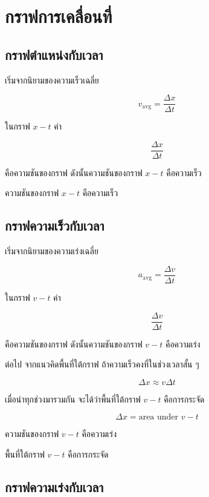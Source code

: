 \section{กราฟการเคลื่อนที่}

\subsection{กราฟตำแหน่งกับเวลา}

เริ่มจากนิยามของความเร็วเฉลี่ย

\[
v_{\text{avg}}=\frac{\Delta x}{\Delta t}
\]

ในกราฟ $x-t$ ค่า

\[
\frac{\Delta x}{\Delta t}
\]

คือความชันของกราฟ ดังนั้นความชันของกราฟ $x-t$ คือความเร็ว

\begin{tcolorbox}[title=สรุปกราฟ $x-t$]
ความชันของกราฟ $x-t$ คือความเร็ว
\end{tcolorbox}

\subsection{กราฟความเร็วกับเวลา}

เริ่มจากนิยามของความเร่งเฉลี่ย

\[
a_{\text{avg}}=\frac{\Delta v}{\Delta t}
\]

ในกราฟ $v-t$ ค่า

\[
\frac{\Delta v}{\Delta t}
\]

คือความชันของกราฟ ดังนั้นความชันของกราฟ $v-t$ คือความเร่ง

ต่อไป จากแนวคิดพื้นที่ใต้กราฟ ถ้าความเร็วคงที่ในช่วงเวลาสั้น ๆ

\[
\Delta x\approx v\Delta t
\]

เมื่อนำทุกช่วงมารวมกัน จะได้ว่าพื้นที่ใต้กราฟ $v-t$ คือการกระจัด

\[
\Delta x=\text{area under }v-t
\]

\begin{tcolorbox}[title=สรุปกราฟ $v-t$]
ความชันของกราฟ $v-t$ คือความเร่ง

พื้นที่ใต้กราฟ $v-t$ คือการกระจัด
\end{tcolorbox}

\subsection{กราฟความเร่งกับเวลา}

